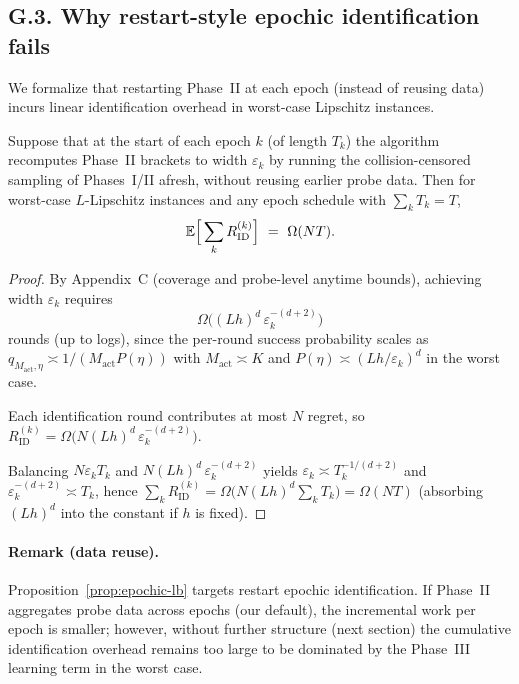 \subsection*{G.3.\; Why restart-style epochic identification fails}
\label{subsec:restart-fail}

We formalize that restarting Phase~II at each epoch (instead of reusing data) incurs linear identification overhead in worst-case Lipschitz instances.

\begin{proposition}
\label{prop:epochic-lb}
Suppose that at the start of each epoch $k$ (of length $T_k$) the algorithm recomputes Phase~II brackets to width $\varepsilon_k$ by running the collision-censored sampling of Phases~I/II afresh, without reusing earlier probe data. Then for worst-case $L$-Lipschitz instances and any epoch schedule with $\sum_k T_k=T$,
\[
\EE\Big[\sum_k R_{\mathrm{ID}}^{(k)}\Big]\ =\ \Omega(NT).
\]
\end{proposition}

\begin{proof}
By Appendix~C (coverage and probe-level anytime bounds), achieving width $\varepsilon_k$ requires
\[
\Omega\!\big((Lh)^d\,\varepsilon_k^{-(d+2)}\big)
\]
rounds (up to logs), since the per-round success probability scales as $q_{M_{\mathrm{act}},\eta}\asymp 1/(M_{\mathrm{act}}P(\eta))$ with $M_{\mathrm{act}}\asymp K$ and $P(\eta)\asymp (Lh/\varepsilon_k)^d$ in the worst case. 

Each identification round contributes at most $N$ regret, so $R_{\mathrm{ID}}^{(k)}=\Omega\!\big(N(Lh)^d\,\varepsilon_k^{-(d+2)}\big)$. 

Balancing $N\varepsilon_k T_k$ and $N(Lh)^d\,\varepsilon_k^{-(d+2)}$ yields $\varepsilon_k\asymp T_k^{-1/(d+2)}$ and $\varepsilon_k^{-(d+2)}\asymp T_k$, hence $\sum_k R_{\mathrm{ID}}^{(k)}=\Omega\!\big(N(Lh)^d \sum_k T_k\big)=\Omega(NT)$ (absorbing $(Lh)^d$ into the constant if $h$ is fixed).
\end{proof}

\paragraph{Remark (data reuse).}
Proposition~\ref{prop:epochic-lb} targets  {restart} epochic identification. If Phase~II aggregates probe data across epochs (our default), the incremental work per epoch is smaller; however, without further structure (next section) the cumulative identification overhead remains too large to be dominated by the Phase~III learning term in the worst case.

